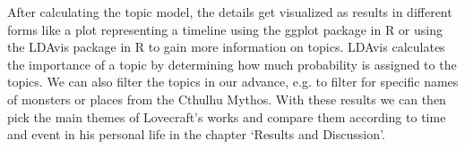 After calculating the topic model, the details get visualized as results in different forms like a plot 
representing a timeline using the ggplot package in R or using the LDAvis package in R to gain more 
information on topics. LDAvis calculates the importance of a topic by determining how much probability 
is assigned to the topics. We can also filter the topics in our advance, e.g. to filter for specific 
names of monsters or places from the Cthulhu Mythos. With these results we can then pick the main themes 
of Lovecraft’s works and compare them according to time and event in his personal life in the chapter 
‘Results and Discussion’.
